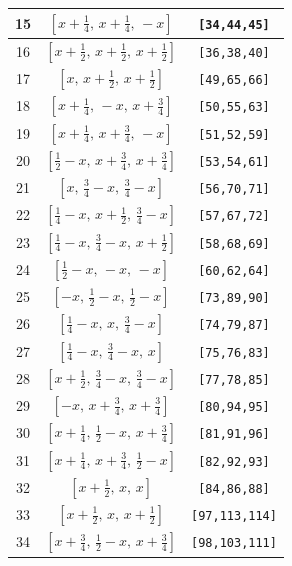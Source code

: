 \documentclass[fleqn,8pt]{jsarticle}
\begin{document}
\begin{longtable}{ccc}
15 & $\left[ x + \frac{1}{4},\, x + \frac{1}{4},\, - x \right]$ & {\tt [34,44,45]} \\ \hline
16 & $\left[ x + \frac{1}{2},\, x + \frac{1}{2},\, x + \frac{1}{2} \right]$ & {\tt [36,38,40]} \\ \hline
17 & $\left[ x,\, x + \frac{1}{2},\, x + \frac{1}{2} \right]$ & {\tt [49,65,66]} \\ \hline
18 & $\left[ x + \frac{1}{4},\, - x,\, x + \frac{3}{4} \right]$ & {\tt [50,55,63]} \\ \hline
19 & $\left[ x + \frac{1}{4},\, x + \frac{3}{4},\, - x \right]$ & {\tt [51,52,59]} \\ \hline
20 & $\left[ \frac{1}{2} - x,\, x + \frac{3}{4},\, x + \frac{3}{4} \right]$ & {\tt [53,54,61]} \\ \hline
21 & $\left[ x,\, \frac{3}{4} - x,\, \frac{3}{4} - x \right]$ & {\tt [56,70,71]} \\ \hline
22 & $\left[ \frac{1}{4} - x,\, x + \frac{1}{2},\, \frac{3}{4} - x \right]$ & {\tt [57,67,72]} \\ \hline
23 & $\left[ \frac{1}{4} - x,\, \frac{3}{4} - x,\, x + \frac{1}{2} \right]$ & {\tt [58,68,69]} \\ \hline
24 & $\left[ \frac{1}{2} - x,\, - x,\, - x \right]$ & {\tt [60,62,64]} \\ \hline
25 & $\left[ - x,\, \frac{1}{2} - x,\, \frac{1}{2} - x \right]$ & {\tt [73,89,90]} \\ \hline
26 & $\left[ \frac{1}{4} - x,\, x,\, \frac{3}{4} - x \right]$ & {\tt [74,79,87]} \\ \hline
27 & $\left[ \frac{1}{4} - x,\, \frac{3}{4} - x,\, x \right]$ & {\tt [75,76,83]} \\ \hline
28 & $\left[ x + \frac{1}{2},\, \frac{3}{4} - x,\, \frac{3}{4} - x \right]$ & {\tt [77,78,85]} \\ \hline
29 & $\left[ - x,\, x + \frac{3}{4},\, x + \frac{3}{4} \right]$ & {\tt [80,94,95]} \\ \hline
30 & $\left[ x + \frac{1}{4},\, \frac{1}{2} - x,\, x + \frac{3}{4} \right]$ & {\tt [81,91,96]} \\ \hline
31 & $\left[ x + \frac{1}{4},\, x + \frac{3}{4},\, \frac{1}{2} - x \right]$ & {\tt [82,92,93]} \\ \hline
32 & $\left[ x + \frac{1}{2},\, x,\, x \right]$ & {\tt [84,86,88]} \\ \hline
33 & $\left[ x + \frac{1}{2},\, x,\, x + \frac{1}{2} \right]$ & {\tt [97,113,114]} \\ \hline
34 & $\left[ x + \frac{3}{4},\, \frac{1}{2} - x,\, x + \frac{3}{4} \right]$ & {\tt [98,103,111]} \\ \hline

\end{longtable}
\end{document}
